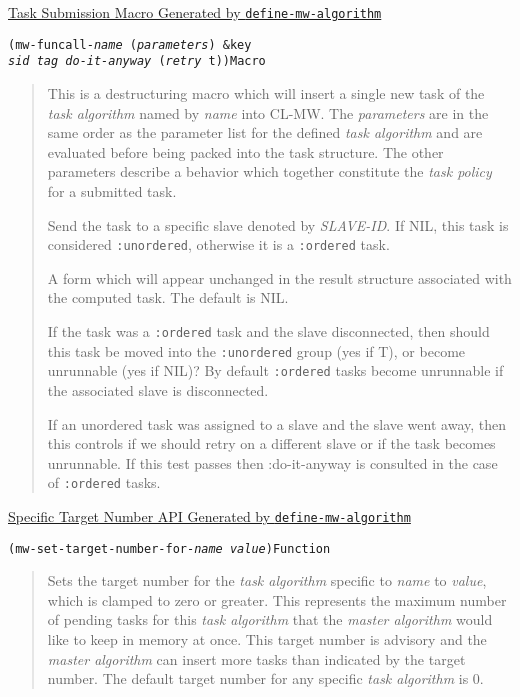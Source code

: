 \documentclass[titlepage,12pt]{book}
\newcommand{\xsmall}{\latexhtml{\small}{}}
\newcommand{\xnormalsize}{\latexhtml{\normalsize}{}}
\newcommand{\clmw}{\xsmall\textsc{CL-MW}\xnormalsize\xspace}
\newcommand{\ma}{\textit{master algorithm}\xspace}
\newcommand{\ta}{\textit{task algorithm}\xspace}
\newcommand{\tp}{\textit{task policy}\xspace}
\newcommand{\un}{\texttt{:unordered}\xspace}
\newcommand{\ord}{\texttt{:ordered}\xspace}
\newcommand{\macro}[1]{\mbox{\texttt{#1}}\xspace}
\newcommand{\apiheader}[1]{\begin{center}\underline{#1}\end{center}}
\newcommand{\apifunc}[2]{\noindent\xsmall\texttt{(#1)}\hspace*{\fill}\xnormalsize\texttt{#2}}
\newenvironment{apientry}[2]
	{\apifunc{#1}{#2}\begin{quotation}}
	{\end{quotation}}
\newcommand{\phlabel}[1]{\phantomsection\label{#1}}
\begin{document}
\apiheader{Task Submission Macro Generated by \macro{define-mw-algorithm}}
\begin{apientry}
{mw-funcall-\textit{name} (\emph{parameters}) \&key\\
\indent \emph{sid} \emph{tag} \emph{do-it-anyway} (\emph{retry} t)}
{Macro}
This is a destructuring macro which will insert a single new task
of the \ta named by \emph{name}  into \clmw. The \emph{parameters}
are in the same order as the parameter list for the defined \ta and
are evaluated before being packed into the task structure. The other
parameters describe a behavior which together constitute the \tp for
a submitted task.

\begin{description}
\phlabel{task-policy}
\item[sid \textit{SLAVE-ID}] Send the task to a specific slave denoted by 
					\textit{SLAVE-ID}.
                    If NIL, this task is considered \un, otherwise it is 
					a \ord task. 
\item[tag \textit{FORM}] A form which will appear unchanged in the result
			structure associated with the computed task. The default is NIL.
\item[do-it-anyway {[T \textit{or} NIL]}] If the task was a 
							\ord task and the slave disconnected, then should
							this task be moved into the \un group (yes if T),
							or become unrunnable (yes if NIL)? By default \ord
							tasks become unrunnable if the associated slave is
							disconnected. 
\item[retry {[T \textit{or} NIL]}] If an unordered task was assigned to a 
			slave and the slave went away, then this controls if we should
			retry on a different slave or if the task becomes unrunnable. If
			this test passes then :do-it-anyway is consulted in the case of
			\ord tasks. 
\end{description}
\end{apientry}

\apiheader{Specific Target Number API Generated by \macro{define-mw-algorithm}}

\begin{apientry}
{mw-set-target-number-for-\textit{name} \emph{value}}
{Function}
Sets the target number for the \ta specific to \emph{name} to
\emph{value}, which is clamped to zero or greater.  This represents
the maximum number of pending tasks for this \ta that
the \ma would like to keep in memory at once. This target number is advisory
and the \ma can insert more tasks than indicated by the target number. The
default target number for any specific \ta is 0.  
\end{apientry}
\end{document}
